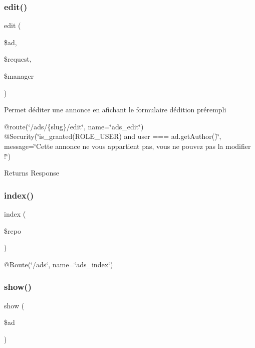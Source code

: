 \subsubsection{\texorpdfstring{edit()}{edit()}}
{\footnotesize\ttfamily edit (\begin{DoxyParamCaption}\item[{\mbox{\hyperlink{class_app_1_1_entity_1_1_ad}{Ad}}}]{\$ad,  }\item[{Request}]{\$request,  }\item[{Object\+Manager}]{\$manager }\end{DoxyParamCaption})}

Permet d\textquotesingle{}éditer une annonce en afichant le formulaire d\textquotesingle{}édition prérempli

@route(\char`\"{}/ads/\{slug\}/edit\char`\"{}, name=\char`\"{}ads\+\_\+edit\char`\"{}) @\+Security(\char`\"{}is\+\_\+granted(\textquotesingle{}\+R\+O\+L\+E\+\_\+\+U\+S\+E\+R\textquotesingle{}) and user === ad.\+get\+Author()\char`\"{}, message=\char`\"{}\+Cette annonce ne vous appartient pas, vous ne pouvez pas la modifier !\char`\"{})

\begin{DoxyReturn}{Returns}
Response 
\end{DoxyReturn}
\mbox{\label{class_app_1_1_controller_1_1_ad_controller_af14e0bf9006c01621d25e389c3f94e28}} 
\subsubsection{\texorpdfstring{index()}{index()}}
{\footnotesize\ttfamily index (\begin{DoxyParamCaption}\item[{\mbox{\hyperlink{class_app_1_1_repository_1_1_ad_repository}{Ad\+Repository}}}]{\$repo }\end{DoxyParamCaption})}

@\+Route(\char`\"{}/ads\char`\"{}, name=\char`\"{}ads\+\_\+index\char`\"{}) \mbox{\label{class_app_1_1_controller_1_1_ad_controller_ac306f7bedbae8f6f8bb15bcc0ae9cd6c}} 
\subsubsection{\texorpdfstring{show()}{show()}}
{\footnotesize\ttfamily show (\begin{DoxyParamCaption}\item[{\mbox{\hyperlink{class_app_1_1_entity_1_1_ad}{Ad}}}]{\$ad }\end{DoxyParamCaption})}

